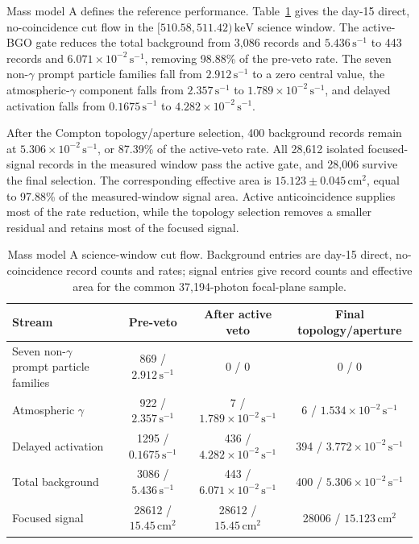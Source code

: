 \documentclass[11pt]{article}
\newcommand{\keV}{\ensuremath{\,\mathrm{keV}}}
\newcommand{\cps}{\ensuremath{\,\mathrm{s^{-1}}}}
\begin{document}
Mass model A defines the reference performance. Table~\ref{tab:phase2_cutflow} gives the day-15 direct, no-coincidence cut flow in the $[510.58,511.42)\keV$ science window. The active-BGO gate reduces the total background from 3,086 records and $5.436\cps$ to 443 records and $6.071\times10^{-2}\cps$, removing 98.88\% of the pre-veto rate. The seven non-$\gamma$ prompt particle families fall from $2.912\cps$ to a zero central value, the atmospheric-$\gamma$ component falls from $2.357\cps$ to $1.789\times10^{-2}\cps$, and delayed activation falls from $0.1675\cps$ to $4.282\times10^{-2}\cps$.

After the Compton topology/aperture selection, 400 background records remain at $5.306\times10^{-2}\cps$, or 87.39\% of the active-veto rate. All 28,612 isolated focused-signal records in the measured window pass the active gate, and 28,006 survive the final selection. The corresponding effective area is $15.123\pm0.045\,\mathrm{cm^2}$, equal to 97.88\% of the measured-window signal area. Active anticoincidence supplies most of the rate reduction, while the topology selection removes a smaller residual and retains most of the focused signal.

\begin{table}[H]
\centering
\caption{Mass model A science-window cut flow. Background entries are day-15 direct, no-coincidence record counts and rates; signal entries give record counts and effective area for the common 37,194-photon focal-plane sample.}
\label{tab:phase2_cutflow}
\footnotesize
\begin{tabular}{lccc}
\toprule
Stream & Pre-veto & After active veto & Final topology/aperture \\
\midrule
Seven non-$\gamma$ prompt particle families & 869 / $2.912\cps$ & 0 / 0 & 0 / 0 \\
Atmospheric $\gamma$ & 922 / $2.357\cps$ & 7 / $1.789\times10^{-2}\cps$ & 6 / $1.534\times10^{-2}\cps$ \\
Delayed activation & 1295 / $0.1675\cps$ & 436 / $4.282\times10^{-2}\cps$ & 394 / $3.772\times10^{-2}\cps$ \\
Total background & 3086 / $5.436\cps$ & 443 / $6.071\times10^{-2}\cps$ & 400 / $5.306\times10^{-2}\cps$ \\
Focused signal & 28612 / $15.45\,\mathrm{cm^2}$ & 28612 / $15.45\,\mathrm{cm^2}$ & 28006 / $15.123\,\mathrm{cm^2}$ \\
\bottomrule
\end{tabular}
\end{table}
\end{document}
